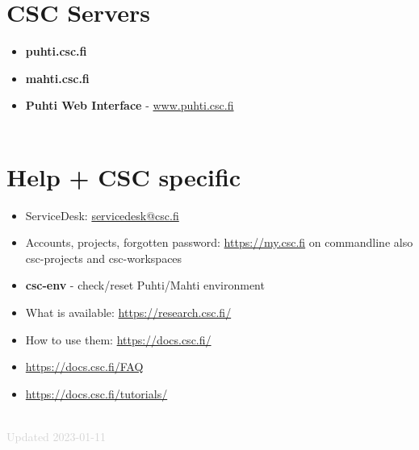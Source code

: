 \documentclass{article}
\begin{document}
\begin{Parallel}{0.48\textwidth}{0.48\textwidth}
{\section*{CSC Servers}
\begin{itemize}[itemsep=1ex,leftmargin=0cm,rightmargin=.52\textwidth]
    \item \textbf{puhti.csc.fi}
    \item \textbf{mahti.csc.fi}
    \item \textbf{Puhti Web Interface} - \href{www.puhti.csc.fi}{www.puhti.csc.fi}
    \\
    \\
\end{itemize}
\section*{Help + CSC specific}
\begin{itemize}[itemsep=1ex,leftmargin=0cm,rightmargin=.52\textwidth]
    \item ServiceDesk: \href{mailto:servicedesk@csc.fi}{servicedesk@csc.fi}  
    \item Accounts, projects, forgotten password: \href{https://my.csc.fi}{https://my.csc.fi} on commandline also csc-projects and csc-workspaces
    \item \textbf{csc-env} - check/reset Puhti/Mahti environment
    \item What is available: \href{https://research.csc.fi/}{https://research.csc.fi/}
    \item How to use them: \href{https://docs.csc.fi/}{https://docs.csc.fi/}
    \item \href{https://docs.csc.fi/FAQ}{https://docs.csc.fi/FAQ}
    \item \href{https://docs.csc.fi/tutorials/}{https://docs.csc.fi/tutorials/}
    \\
    \\
\end{itemize}
}
\ParallelPar
\end{Parallel}





\textcolor{lightgray}{Updated 2023-01-11}
\end{document}
